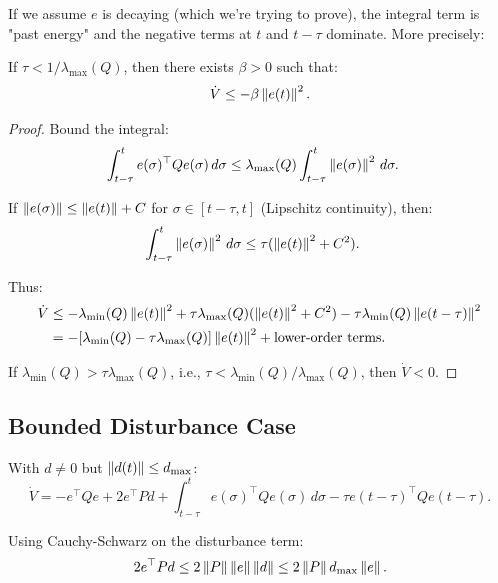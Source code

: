 If we assume $e$ is decaying (which we're trying to prove), the integral term is "past energy" and the negative terms at $t$ and $t-\tau$ dominate. More precisely:

\begin{lemma}
If $\tau < 1 / \lambda_{\max}(Q)$, then there exists $\beta > 0$ such that:
\begin{equation}
    \dot{V} \leq -\beta \left\| e(t) \right\|^2.
\end{equation}
\end{lemma}

\begin{proof}
Bound the integral:
\begin{align}
    \int_{t-\tau}^t e(\sigma)^\top Q e(\sigma) \, d\sigma &\leq \lambda_{\max}(Q) \int_{t-\tau}^t \left\| e(\sigma) \right\|^2 \, d\sigma.
\end{align}

If $\left\| e(\sigma) \right\| \leq \left\| e(t) \right\| + C$ for $\sigma \in [t-\tau, t]$ (Lipschitz continuity), then:
\begin{align}
    \int_{t-\tau}^t \left\| e(\sigma) \right\|^2 \, d\sigma &\leq \tau (\left\| e(t) \right\|^2 + C^2).
\end{align}

Thus:
\begin{align}
    \dot{V} &\leq -\lambda_{\min}(Q) \left\| e(t) \right\|^2 + \tau \lambda_{\max}(Q) (\left\| e(t) \right\|^2 + C^2) - \tau \lambda_{\min}(Q) \left\| e(t-\tau) \right\|^2 \\
    &= -[\lambda_{\min}(Q) - \tau \lambda_{\max}(Q)] \left\| e(t) \right\|^2 + \text{lower-order terms}.
\end{align}

If $\lambda_{\min}(Q) > \tau \lambda_{\max}(Q)$, i.e., $\tau < \lambda_{\min}(Q) / \lambda_{\max}(Q)$, then $\dot{V} < 0$.
\end{proof}

\subsection{Bounded Disturbance Case}

With $d \neq 0$ but $\left\| d(t) \right\| \leq d_{\max}$:
\begin{equation}
    \dot{V} = -e^\top Q e + 2 e^\top P d + \int_{t-\tau}^t e(\sigma)^\top Q e(\sigma) \, d\sigma - \tau e(t-\tau)^\top Q e(t-\tau).
\end{equation}

Using Cauchy-Schwarz on the disturbance term:
\begin{equation}
    2 e^\top P d \leq 2 \left\| P \right\| \left\| e \right\| \left\| d \right\| \leq 2 \left\| P \right\| d_{\max} \left\| e \right\|.
\end{equation}

